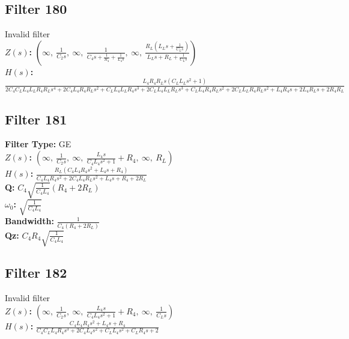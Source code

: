 \documentclass{article}
\begin{document}
\subsection*{Filter 180}
Invalid filter \\ 
\textbf{$Z(s)$:} $\left( \infty, \  \frac{1}{C_{2} s}, \  \infty, \  \frac{1}{C_{4} s + \frac{1}{R_{4}} + \frac{1}{L_{4} s}}, \  \infty, \  \frac{R_{L} \left(L_{L} s + \frac{1}{C_{L} s}\right)}{L_{L} s + R_{L} + \frac{1}{C_{L} s}}\right)$ \\ 
\textbf{$H(s)$:} $\frac{L_{4} R_{4} R_{L} s \left(C_{L} L_{L} s^{2} + 1\right)}{2 C_{4} C_{L} L_{4} L_{L} R_{4} R_{L} s^{4} + 2 C_{4} L_{4} R_{4} R_{L} s^{2} + C_{L} L_{4} L_{L} R_{4} s^{3} + 2 C_{L} L_{4} L_{L} R_{L} s^{3} + C_{L} L_{4} R_{4} R_{L} s^{2} + 2 C_{L} L_{L} R_{4} R_{L} s^{2} + L_{4} R_{4} s + 2 L_{4} R_{L} s + 2 R_{4} R_{L}}$ \\ 
\subsection*{Filter 181}
\textbf{Filter Type:} GE \\ 
\textbf{$Z(s)$:} $\left( \infty, \  \frac{1}{C_{2} s}, \  \infty, \  \frac{L_{4} s}{C_{4} L_{4} s^{2} + 1} + R_{4}, \  \infty, \  R_{L}\right)$ \\ 
\textbf{$H(s)$:} $\frac{R_{L} \left(C_{4} L_{4} R_{4} s^{2} + L_{4} s + R_{4}\right)}{C_{4} L_{4} R_{4} s^{2} + 2 C_{4} L_{4} R_{L} s^{2} + L_{4} s + R_{4} + 2 R_{L}}$ \\ 
\textbf{Q:} $C_{4} \sqrt{\frac{1}{C_{4} L_{4}}} \left(R_{4} + 2 R_{L}\right)$ \\ 
\textbf{$\omega_0$:} $\sqrt{\frac{1}{C_{4} L_{4}}}$ \\ 
\textbf{Bandwidth:} $\frac{1}{C_{4} \left(R_{4} + 2 R_{L}\right)}$ \\ 
\textbf{Qz:} $C_{4} R_{4} \sqrt{\frac{1}{C_{4} L_{4}}}$ \\ 
\subsection*{Filter 182}
Invalid filter \\ 
\textbf{$Z(s)$:} $\left( \infty, \  \frac{1}{C_{2} s}, \  \infty, \  \frac{L_{4} s}{C_{4} L_{4} s^{2} + 1} + R_{4}, \  \infty, \  \frac{1}{C_{L} s}\right)$ \\ 
\textbf{$H(s)$:} $\frac{C_{4} L_{4} R_{4} s^{2} + L_{4} s + R_{4}}{C_{4} C_{L} L_{4} R_{4} s^{3} + 2 C_{4} L_{4} s^{2} + C_{L} L_{4} s^{2} + C_{L} R_{4} s + 2}$ \\ 
\end{document}
